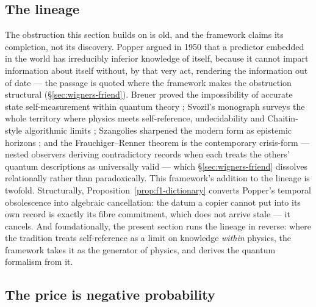 \subsection{The lineage}

The obstruction this section builds on is old, and the framework claims its completion, not its
discovery. Popper argued in 1950 that a predictor embedded in the world has irreducibly inferior
knowledge of itself, because it cannot impart information about itself without, by that very act,
rendering the information out of date \autocite{Popper1950a,Popper1950b} --- the passage is quoted
where the framework makes the obstruction structural (\S\ref{sec:wigners-friend}). Breuer proved
the impossibility of accurate state self-measurement within quantum theory \autocite{Breuer1995};
Svozil's monograph surveys the whole territory where physics meets self-reference, undecidability
and Chaitin-style algorithmic limits \autocite{svozil_k_2018}; Szangolies sharpened the modern form
as epistemic horizons \autocite{szangolies_j_2018}; and the Frauchiger--Renner theorem is the
contemporary crisis-form --- nested observers deriving contradictory records when each treats the
others' quantum descriptions as universally valid \autocite{Frauchiger_2018} --- which
\S\ref{sec:wigners-friend} dissolves relationally rather than paradoxically. This framework's
addition to the lineage is twofold. Structurally, Proposition~\ref{prop:f1-dictionary} converts
Popper's temporal obsolescence into algebraic cancellation: the datum a copier cannot put into its
own record is exactly its fibre commitment, which does not arrive stale --- it cancels. And
foundationally, the present section runs the lineage in reverse: where the tradition treats
self-reference as a limit on knowledge \emph{within} physics, the framework takes it as the
generator of physics, and derives the quantum formalism from it.

\subsection{The price is negative probability}\label{sec:complex-amplitudes-2}

